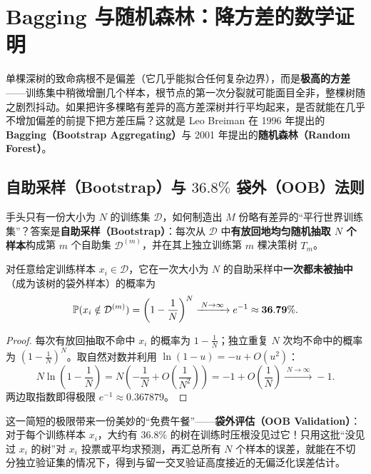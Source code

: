 \section{Bagging 与随机森林：降方差的数学证明}\label{sec:trees-rf}

单棵深树的致命病根不是偏差（它几乎能拟合任何复杂边界），而是\textbf{极高的方差}——训练集中稍微增删几个样本，根节点的第一次分裂就可能面目全非，整棵树随之剧烈抖动。如果把许多棵略有差异的高方差深树并行平均起来，是否就能在几乎不增加偏差的前提下把方差压扁？这就是 Leo Breiman 在 1996 年提出的 \textbf{Bagging（Bootstrap Aggregating）}与 2001 年提出的\textbf{随机森林（Random Forest）}。

\subsection{自助采样（Bootstrap）与 $36.8\%$ 袋外（OOB）法则}

手头只有一份大小为 $N$ 的训练集 $\mathcal{D}$，如何制造出 $M$ 份略有差异的“平行世界训练集”？答案是\textbf{自助采样（Bootstrap）}：每次从 $\mathcal{D}$ 中\textbf{有放回地均匀随机抽取 $N$ 个样本}构成第 $m$ 个自助集 $\mathcal{D}^{(m)}$，并在其上独立训练第 $m$ 棵决策树 $T_m$。

\begin{thmBox}
\begin{proposition}\label{prop:oob-limit}
对任意给定训练样本 $x_i \in \mathcal{D}$，它在一次大小为 $N$ 的自助采样中\textbf{一次都未被抽中}（成为该树的袋外样本）的概率为
\[
  \mathbb{P}(x_i \notin \mathcal{D}^{(m)}) = \left(1 - \frac{1}{N}\right)^{N} \xrightarrow{\;N \to \infty\;} e^{-1} \approx \mathbf{36.79\%}.
\]
\end{proposition}
\end{thmBox}

\begin{proof}
每次有放回抽取不命中 $x_i$ 的概率为 $1 - \frac{1}{N}$；独立重复 $N$ 次均不命中的概率为 $(1 - \frac{1}{N})^N$。取自然对数并利用 $\ln(1 - u) = -u + O(u^2)$：
\[
  N \ln\!\left(1 - \frac{1}{N}\right) = N\left(-\frac{1}{N} + O\!\left(\frac{1}{N^2}\right)\right) = -1 + O\!\left(\frac{1}{N}\right) \xrightarrow{\;N\to\infty\;} -1.
\]
两边取指数即得极限 $e^{-1} \approx 0.367879$。
\end{proof}

这一简短的极限带来一份美妙的“免费午餐”——\textbf{袋外评估（OOB Validation）}：对于每个训练样本 $x_i$，大约有 $36.8\%$ 的树在训练时压根没见过它！只用这批“没见过 $x_i$ 的树”对 $x_i$ 投票或平均求预测，再汇总所有 $N$ 个样本的误差，就能在不切分独立验证集的情况下，得到与留一交叉验证高度接近的无偏泛化误差估计。

